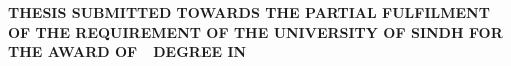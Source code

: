 \begin{titlepage}
\vspace{1.5cm}

\LARGE{\bfseries\MakeUppercase\thesisAuthor}

\vspace{1cm}

\begin{center}

\fontsize{10}{12}\selectfont\bfseries
\MakeUppercase{
Thesis submitted towards the partial fulfilment of the requirement of the University of Sindh for the award of~\degree~degree in~\degreeSubject
}
\end{center}


\vspace*{\fill}

\begin{center}
\large\bfseries
\department \\
\university \\
\thesisSubmissionYear\\
\end{center}

\end{titlepage}
\clearpage
